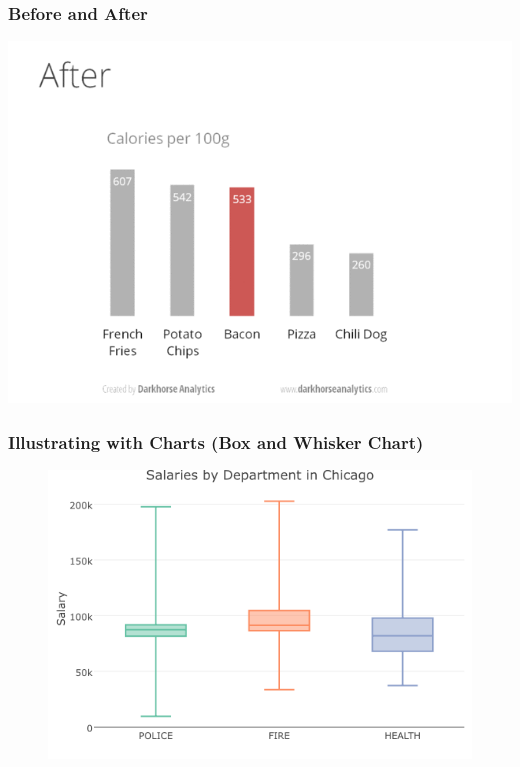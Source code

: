 \documentclass[handout]{beamer}
\begin{document}
\begin{frame}
\frametitle{Before and After}
	\includegraphics[width = \textwidth]{./images/designAfter.png}
\end{frame}

\begin{frame}
\frametitle{Illustrating with Charts (Box and Whisker Chart)}
	\begin{figure}
		\includegraphics[scale = 0.5]{./images/chicagoBoxPlot.png}
	\end{figure}
\end{frame}
\end{document}
